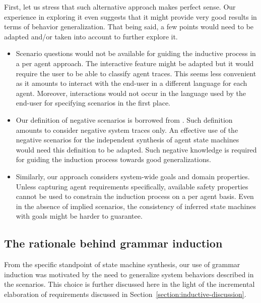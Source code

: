 First, let us stress that such alternative approach makes perfect sense. Our experience in exploring it even suggests that it might provide very good results in terms of behavior generalization. That being said, a few points would need to be adapted and/or taken into account to further explore it.
\begin{itemize}
\item Scenario questions would not be available for guiding the inductive process in a per agent approach. The interactive feature might be adapted but it would require the user to be able to classify agent traces. This seems less convenient as it amounts to interact with the end-user in a different language for each agent. Moreover, interactions would not occur in the language used by the end-user for specifying scenarios in the first place. 
\item Our definition of negative scenarios is borrowed from \cite{Uchitel:2002}. Such definition amounts to consider negative system traces only. An effective use of the negative scenarios for the independent synthesis of agent state machines would need this definition to be adapted. Such negative knowledge is required for guiding the induction process towards good generalizations.
\item Similarly, our approach considers system-wide goals and domain properties. Unless capturing agent requirements specifically, available safety properties cannot be used to constrain the induction process on a per agent basis. Even in the absence of implied scenarios, the consistency of inferred state machines with goals might be harder to guarantee.
\end{itemize}

\subsection{The rationale behind grammar induction\label{subsection:grammar-induction-rationale}}

From the specific standpoint of state machine synthesis, our use of grammar induction was motivated by the need to generalize system behaviors described in the scenarios. This choice is further discussed here in the light of the incremental elaboration of requirements discussed in Section~\ref{section:inductive-discussion}.

